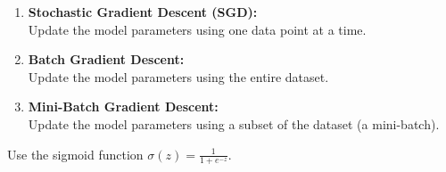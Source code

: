 \begin{enumerate}
    \item \textbf{Stochastic Gradient Descent (SGD):} \\
    Update the model parameters using one data point at a time.

    \item \textbf{Batch Gradient Descent:} \\
    Update the model parameters using the entire dataset.

    \item \textbf{Mini-Batch Gradient Descent:} \\
    Update the model parameters using a subset of the dataset (a mini-batch).
\end{enumerate}

Use the sigmoid function \( \sigma(z) = \frac{1}{1 + e^{-z}} \).
